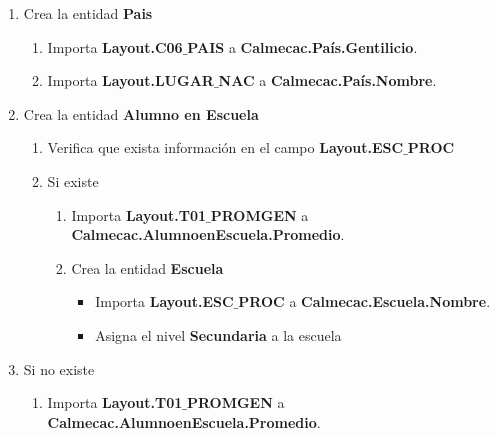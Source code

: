 \begin{enumerate}
\begin{enumerate}
		\item Crea la entidad \textbf{Pais}
		
			\begin{enumerate}
			
			\item Importa \textbf{Layout.C06$\_$PAIS} a \textbf{Calmecac.País.Gentilicio}.
		
			\item Importa \textbf{Layout.LUGAR$\_$NAC} a \textbf{Calmecac.País.Nombre}.
			
			\end{enumerate}
		
		\item Crea la entidad \textbf{Alumno en Escuela}
		
			\begin{enumerate}
		
			\item Verifica que exista información en el campo \textbf{Layout.ESC$\_$PROC}
		
			\item Si existe
			
				\begin{enumerate}
		
				\item Importa \textbf{Layout.T01$\_$PROMGEN} a \textbf{Calmecac.AlumnoenEscuela.Promedio}.
				
				\item Crea la entidad \textbf{Escuela}
		
					\begin{itemize}
		
					\item Importa \textbf{Layout.ESC$\_$PROC} a \textbf{Calmecac.Escuela.Nombre}.
					
					\item Asigna el nivel \textbf{Secundaria} a la escuela
					
					\end{itemize}
				
				\end{enumerate}
			
			\end{enumerate}
		
		\item Si no existe
		
			\begin{enumerate}
		
			\item Importa \textbf{Layout.T01$\_$PROMGEN} a \textbf{Calmecac.AlumnoenEscuela.Promedio}.
			

\end{enumerate}
\end{enumerate}
\end{enumerate}
